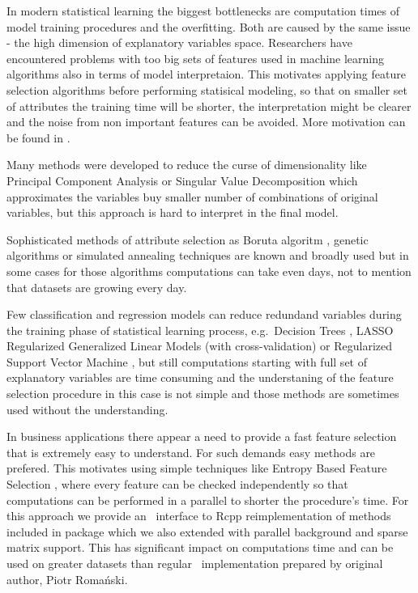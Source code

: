 In modern statistical learning the biggest bottlenecks are computation
times of model training procedures and the overfitting. Both are caused
by the same issue - the high dimension of explanatory variables space.
Researchers have encountered problems with too big sets of features used
in machine learning algorithms also in terms of model interpretaion.
This motivates applying feature selection algorithms before performing
statisical modeling, so that on smaller set of attributes the training
time will be shorter, the interpretation might be clearer and the noise
from non important features can be avoided. More motivation can be found
in \cite{John94irrelevantfeatures}. \par Many methods were developed to
reduce the curse of dimensionality like Principal Component Analysis
\citep{PCA:14786440109462720} or Singular Value Decomposition
\citep{eckart1936approximation} which approximates the variables buy
smaller number of combinations of original variables, but this approach
is hard to interpret in the final model. \par Sophisticated methods of
attribute selection as Boruta algoritm \citep{Boruta}, genetic
algorithms \citep{geneticAlgo, FedCSIS2013l106} or simulated annealing
techniques \citep{Khachaturyan:a19748} are known and broadly used but in
some cases for those algorithms computations can take even days, not to
mention that datasets are growing every day. \par Few classification and
regression models can reduce redundand variables during the training
phase of statistical learning process, e.g.~Decision Trees
\citep{Rokach:2008:DMD:1796114, cart84}, LASSO Regularized Generalized
Linear Models (with cross-validation) \citep{glmnet} or Regularized
Support Vector Machine \citep{Xu:2009:RRS:1577069.1755834}, but still
computations starting with full set of explanatory variables are time
consuming and the understaning of the feature selection procedure in
this case is not simple and those methods are sometimes used without the
understanding. \par In business applications there appear a need to
provide a fast feature selection that is extremely easy to understand.
For such demands easy methods are prefered. This motivates using simple
techniques like Entropy Based Feature Selection
\citep{Largeron:2011:EBF:1982185.1982389}, where every feature can be
checked independently so that computations can be performed in a
parallel to shorter the procedure's time. For this approach we provide
an \R ~interface to Rcpp reimplementation of methods included in
 package which we also extended with parallel background
and sparse matrix support. This has significant impact on computations
time and can be used on greater datasets than regular \R ~implementation
prepared by  original author, Piotr Romański.

